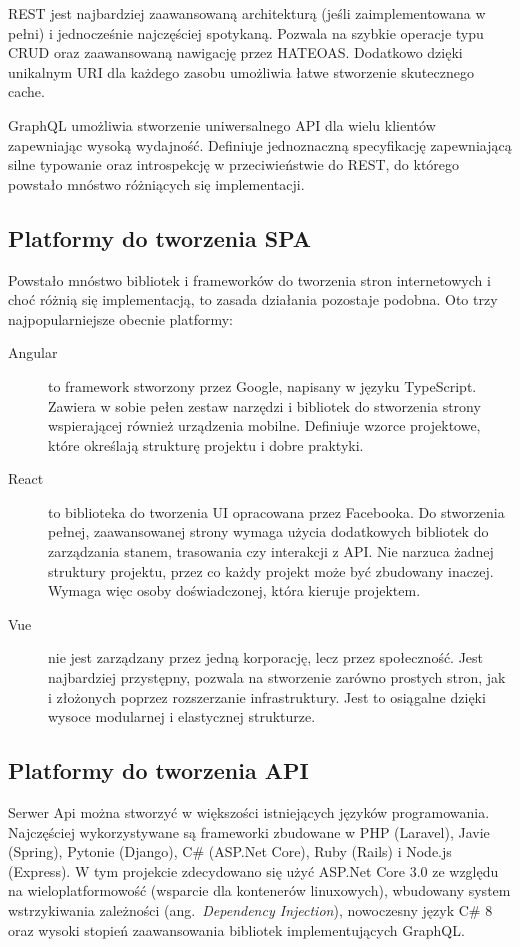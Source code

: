 		REST jest najbardziej zaawansowaną architekturą (jeśli zaimplementowana w pełni) i jednocześnie najczęściej spotykaną.
		Pozwala na szybkie operacje typu CRUD oraz zaawansowaną nawigację przez HATEOAS.
		Dodatkowo dzięki unikalnym URI dla każdego zasobu umożliwia łatwe stworzenie skutecznego cache.

		GraphQL umożliwia stworzenie uniwersalnego API dla wielu klientów zapewniając wysoką wydajność.
		Definiuje jednoznaczną specyfikację zapewniającą silne typowanie oraz introspekcję w przeciwieństwie do REST,
		do którego powstało mnóstwo różniących się implementacji.

	\subsection{Platformy do tworzenia SPA}
		Powstało mnóstwo bibliotek i frameworków do tworzenia stron internetowych i choć różnią się implementacją, to zasada działania pozostaje podobna.
		Oto trzy najpopularniejsze obecnie platformy:
		\begin{description}
			\item[Angular] to framework stworzony przez Google, napisany w języku TypeScript.
				Zawiera w sobie pełen zestaw narzędzi i bibliotek do stworzenia strony wspierającej również urządzenia mobilne.
				Definiuje wzorce projektowe, które określają strukturę projektu i dobre praktyki.

			\item[React] to biblioteka do tworzenia UI opracowana przez Facebooka.
				Do stworzenia pełnej, zaawansowanej strony wymaga użycia dodatkowych bibliotek do zarządzania stanem, trasowania czy interakcji z API.
				Nie narzuca żadnej struktury projektu, przez co każdy projekt może być zbudowany inaczej.
				Wymaga więc osoby doświadczonej, która kieruje projektem.

			\item[Vue] nie jest zarządzany przez jedną korporację, lecz przez społeczność.
				Jest najbardziej przystępny, pozwala na stworzenie zarówno prostych stron, jak i złożonych poprzez rozszerzanie infrastruktury.
				Jest to osiągalne dzięki wysoce modularnej i elastycznej strukturze.
		\end{description}

	\subsection{Platformy do tworzenia API}
		Serwer Api można stworzyć w większości istniejących języków programowania.
		Najczęściej wykorzystywane są frameworki zbudowane w PHP (Laravel), Javie (Spring), Pytonie (Django), C\# (ASP.Net Core), Ruby (Rails) i Node.js (Express).
		W tym projekcie zdecydowano się użyć ASP.Net Core 3.0 ze względu na wieloplatformowość (wsparcie dla kontenerów linuxowych),
		wbudowany system wstrzykiwania zależności (ang.\ \emph{Dependency Injection}), nowoczesny język C\# 8 oraz wysoki stopień zaawansowania bibliotek implementujących GraphQL.